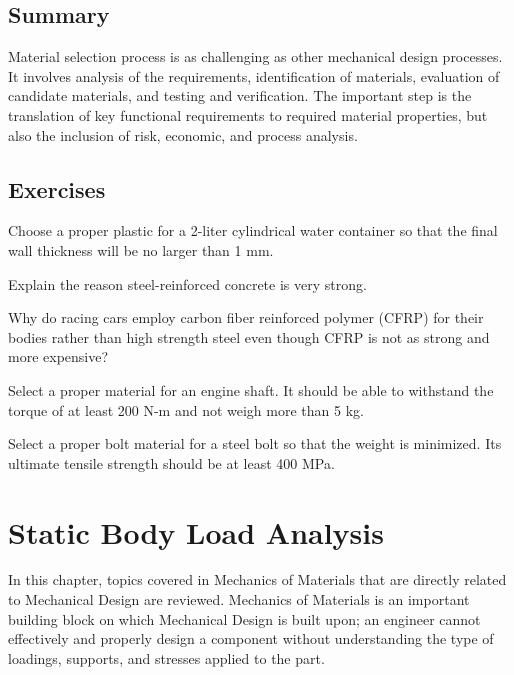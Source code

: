 \documentclass[
10pt,
a4paper,
openany,
svgnames,
]{book}
\newcommand{\exercise}{%
\item \label{lab:\arabic{chapter}-\arabic{exercisesi}}  %
}
\begin{document}
\section*{Summary}

Material selection process is as challenging as other mechanical design processes. It involves analysis of the requirements, identification of materials, evaluation of candidate materials, and testing and verification. The important step is the translation of key functional requirements to required material properties, but also the inclusion of risk, economic, and process analysis.

\section*{Exercises}

\begin{exercises}

  \exercise Choose a proper plastic for a 2-liter cylindrical water container so that the final wall thickness will be no larger than 1 mm.

  \exercise Explain the reason steel-reinforced concrete is very strong.

  \exercise Why do racing cars employ carbon fiber reinforced polymer (CFRP) for their bodies rather than high strength steel even though CFRP is not as strong and more expensive?

  \exercise Select a proper material for an engine shaft. It should be able to withstand the torque of at least 200 N-m and not weigh more than 5 kg.

  \exercise Select a proper bolt material for a steel bolt so that the weight is minimized. Its ultimate tensile strength should be at least 400 MPa.

\end{exercises}


 
\chapter{Static Body Load Analysis}

In this chapter, topics covered in Mechanics of Materials that are directly related to Mechanical Design are reviewed. Mechanics of Materials is an important building block on which Mechanical Design is built upon; an engineer cannot effectively and properly design a component without understanding the type of loadings, supports, and stresses applied to the part.
\end{document}
